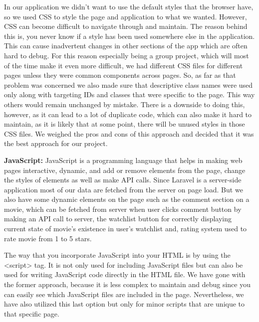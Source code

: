In our application we didn’t want to use the default styles that the browser have, so we used CSS to style the page and application to what we wanted.
However, CSS can become difficult to navigate through and maintain.
The reason behind this is, you never know if a style has been used somewhere else in the application.
This can cause inadvertent changes in other sections of the app which are often hard to debug.
For this reason especially being a group project, which will most of the time make it even more difficult, we had different CSS files for different pages unless they were common components across pages.
So, as far as that problem was concerned we also made sure that descriptive class names were used only along with targeting IDs and classes that were specific to the page. This way others would remain unchanged by mistake.
There is a downside to doing this, however, as it can lead to a lot of duplicate code, which can also make it hard to maintain, as it is likely that at some point, there will be unused styles in those CSS files.
We weighed the pros and cons of this approach and decided that it was the best approach for our project.\newline

\textbf{JavaScript:} \newline
JavaScript is a programming language that helps in making web pages interactive, dynamic, and add or remove elements from the page, change the styles of elements as well as make API calls.
Since Laravel is a server-side application most of our data are fetched from the server on page load.
But we also have some dynamic elements on the page such as the comment section on a movie, which can be fetched from server when user clicks comment button by making an API call to server, the watchlist button for correctly displaying current state of movie’s existence in user's watchlist and, rating system used to rate movie from 1 to 5 stars.\newline

The way that you incorporate JavaScript into your HTML is by using the \textless{}script\textgreater{} tag. It is not only used for including JavaScript files but can also be used for writing JavaScript code directly in the HTML file.
We have gone with the former approach, because it is less complex to maintain and debug since you can easily see which JavaScript files are included in the page.
Nevertheless, we have also utilized this last option but only for minor scripts that are unique to that specific page.\newline